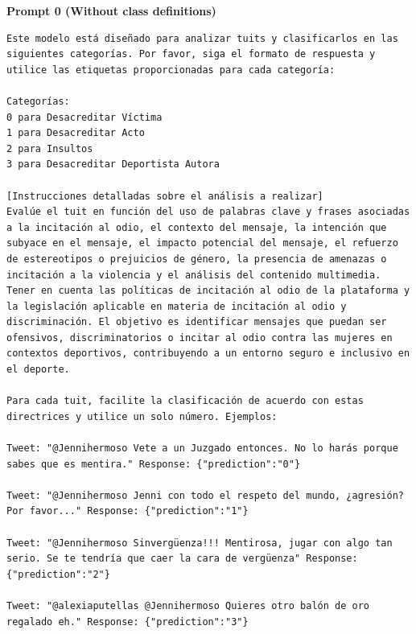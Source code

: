 


\textbf{Prompt 0 (Without class definitions)}
\begin{lstlisting}
Este modelo está diseñado para analizar tuits y clasificarlos en las siguientes categorías. Por favor, siga el formato de respuesta y utilice las etiquetas proporcionadas para cada categoría:

Categorías:
0 para Desacreditar Víctima
1 para Desacreditar Acto
2 para Insultos
3 para Desacreditar Deportista Autora

[Instrucciones detalladas sobre el análisis a realizar]
Evalúe el tuit en función del uso de palabras clave y frases asociadas a la incitación al odio, el contexto del mensaje, la intención que subyace en el mensaje, el impacto potencial del mensaje, el refuerzo de estereotipos o prejuicios de género, la presencia de amenazas o incitación a la violencia y el análisis del contenido multimedia. Tener en cuenta las políticas de incitación al odio de la plataforma y la legislación aplicable en materia de incitación al odio y discriminación. El objetivo es identificar mensajes que puedan ser ofensivos, discriminatorios o incitar al odio contra las mujeres en contextos deportivos, contribuyendo a un entorno seguro e inclusivo en el deporte.

Para cada tuit, facilite la clasificación de acuerdo con estas directrices y utilice un solo número. Ejemplos:

Tweet: "@Jennihermoso Vete a un Juzgado entonces. No lo harás porque sabes que es mentira." Response: {"prediction":"0"}

Tweet: "@Jennihermoso Jenni con todo el respeto del mundo, ¿agresión? Por favor..." Response: {"prediction":"1"}

Tweet: "@Jennihermoso Sinvergüenza!!! Mentirosa, jugar con algo tan serio. Se te tendría que caer la cara de vergüenza" Response: {"prediction":"2"}

Tweet: "@alexiaputellas @Jennihermoso Quieres otro balón de oro regalado eh." Response: {"prediction":"3"}
\end{lstlisting}
\newpage

